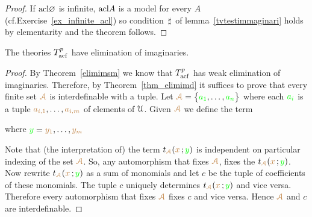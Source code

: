 \begin{proof}
If ${\rm acl}\varnothing$ is infinite, ${\rm acl} A$ is a model for every $A$ (cf.\@ Exercise~\ref{ex_infinite_acl}) so condition $\,\sharp\,$ of lemma~\ref{tvtestimmaginari} holds by elementarity and the theorem follows.
\end{proof}


\begin{theorem}\label{elimimacf} 
The theories $T^p_{\rm acf}$ have elimination of imaginaries.
\end{theorem}

\begin{proof}
By Theorem~\ref{elimimsm} we know that $T^p_{\rm acf}$ has weak elimination of imaginaries.
Therefore, by Theorem~\ref{thm_elimimd} it suffices to prove that every finite set ${\color{brown}\EuScript A}$ is interdefinable with a tuple.
Let ${\color{brown}\EuScript A}=\big\{{\color{green} a_1},\dots,{\color{green} a_n}\big\}$ where each ${\color{green} a_i}$ is a tuple ${\color{brown} a_{i,1}},\dots,{\color{brown} a_{i,m}}$ of elements of $\EuScript U$.
Given ${\color{brown}\EuScript A}$ we define the term

\hfill where ${\color{green} y}={\color{brown} y_1},\dots,{\color{brown} y_m}$


Note that (the interpretation of) the term $t_{\color{brown}\EuScript A}({\color{brown} x}\,;{\color{green} y})$ is independent on particular indexing of the set ${\color{brown}\EuScript A}$.
So, any automorphism that fixes ${\color{brown}\EuScript A}$, fixes the  $t_{\color{brown}\EuScript A}({\color{brown} x}\,;{\color{green} y})$.
Now rewrite $t_{\color{brown}\EuScript A}({\color{brown} x}\,;{\color{green} y})$ as a sum of monomials and let $c$ be the tuple of coefficients of these monomials.
The tuple $c$ uniquely determines $t_{\color{brown}\EuScript A}({\color{brown} x}\,;{\color{green} y})$ and vice versa.
Therefore every automorphism that fixes  ${\color{brown}\EuScript A}$ fixes  $c$ and vice versa.
Hence  ${\color{brown}\EuScript A}$ and  $c$ are interdefinable.
\end{proof}

